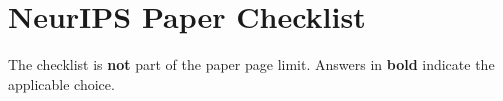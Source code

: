 \documentclass{article}
\begin{document}




\newpage
\section*{NeurIPS Paper Checklist}

The checklist is \textbf{not} part of the paper page limit.
Answers in \textbf{bold} indicate the applicable choice.
\end{document}
